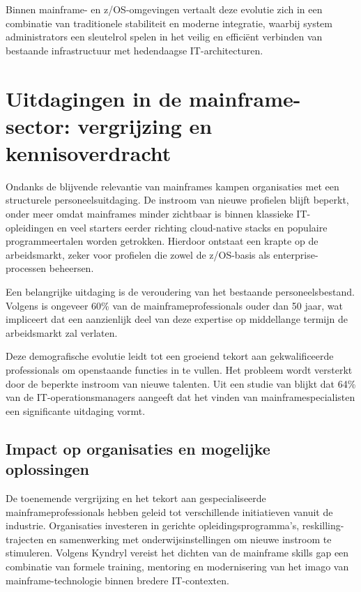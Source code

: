 Binnen mainframe- en z/OS-omgevingen vertaalt deze evolutie zich in een combinatie van traditionele stabiliteit en moderne integratie, waarbij system administrators een sleutelrol spelen in het veilig en efficiënt verbinden van bestaande infrastructuur met hedendaagse IT-architecturen.

\section{Uitdagingen in de mainframe-sector: vergrijzing en kennisoverdracht}
\label{sec:mainframe-uitdagingen-vergrijzing}

Ondanks de blijvende relevantie van mainframes kampen organisaties met een structurele personeelsuitdaging. De instroom van nieuwe profielen blijft beperkt, onder meer omdat mainframes minder zichtbaar is binnen klassieke IT-opleidingen en veel starters eerder richting cloud-native stacks en populaire programmeertalen worden getrokken. Hierdoor ontstaat een krapte op de arbeidsmarkt, zeker voor profielen die zowel de z/OS-basis als enterprise-processen beheersen.

Een belangrijke uitdaging is de veroudering van het bestaande personeelsbestand. Volgens \textcite{astadia_retirement} is ongeveer 60\% van de mainframeprofessionals ouder dan 50 jaar, wat impliceert dat een aanzienlijk deel van deze expertise op middellange termijn de arbeidsmarkt zal verlaten.

Deze demografische evolutie leidt tot een groeiend tekort aan gekwalificeerde professionals om openstaande functies in te vullen. Het probleem wordt versterkt door de beperkte instroom van nieuwe talenten. Uit een studie van \textcite{astadia_retirement} blijkt dat 64\% van de IT-operationsmanagers aangeeft dat het vinden van mainframespecialisten een significante uitdaging vormt. 


\subsection{Impact op organisaties en mogelijke oplossingen}
\label{sec:bestaande-ops}

De toenemende vergrijzing en het tekort aan gespecialiseerde mainframeprofessionals hebben geleid tot verschillende initiatieven vanuit de industrie. Organisaties investeren in gerichte opleidingsprogramma’s, reskilling-trajecten en samenwerking met onderwijsinstellingen om nieuwe instroom te stimuleren. Volgens Kyndryl \autocite{kyndrylskillsgap} vereist het dichten van de mainframe skills gap een combinatie van formele training, mentoring en modernisering van het imago van mainframe-technologie binnen bredere IT-contexten. 

